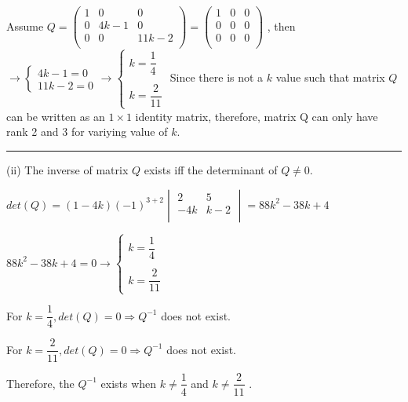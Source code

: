 \documentclass[fleqn]{article}
\begin{document}
\begin{enumerate}
      \textcolor{hwColor}{
        Assume
        $
          Q=\begin{pmatrix}
          1 & 0 & 0 \\
          0 & 4k-1 & 0 \\
          0 & 0 & 11k-2 \\
        \end{pmatrix}=\begin{pmatrix}
          1 & 0 & 0 \\
          0 & 0 & 0 \\
          0 & 0 & 0 \\
        \end{pmatrix}
        $
        , then 
        $
         \longrightarrow
         \begin{cases}
           4k-1=0 \\
           11k-2=0  
         \end{cases}
         \longrightarrow
         \begin{cases}
           k=\dfrac{1}{4} \\
           \\
           k= \dfrac{2}{11} 
         \end{cases}
        $
        Since there is not a $k$ value such that matrix $Q$ can be written as an $1 \times 1$ identity matrix, therefore, matrix Q can only have rank 2 and 3 for variying value of $k$. 
      }

      \bigbreak

      \textcolor{hwColor}{
        \rule{16cm}{0.4pt}
      }

      \bigbreak

      \textcolor{hwColor}{
        (ii) The inverse of matrix $Q$ exists iff the determinant of $Q\neq0$.
      }

      \textcolor{hwColor}{
        $
        det(Q)=(1-4k)(-1)^{3+2}\begin{vmatrix}
          2 & 5 \\
          -4k & k-2 \\
        \end{vmatrix}
        =
        88k^2-38k+4
        $
      }

      \textcolor{hwColor}{
        $
        88k^2-38k+4=0
        \longrightarrow
        \begin{cases}
          k=\dfrac{1}{4} \\
          \\
          k= \dfrac{2}{11} 
        \end{cases}
        $
      }

      \textcolor{hwColor}{
        For $k=\dfrac{1}{4}, det(Q)=0 \Longrightarrow Q^{-1}$ does not exist.  
      }

      \textcolor{hwColor}{
        For $k=\dfrac{2}{11}, det(Q)=0 \Longrightarrow Q^{-1}$ does not exist.  
      }

      \textcolor{hwColor}{
        Therefore, the $Q^{-1}$ exists when $k\neq\dfrac{1}{4}$ and $k\neq\dfrac{2}{11}$  .  
      }



  \end{enumerate}
\end{document}
